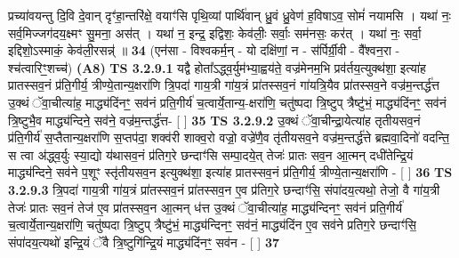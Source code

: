 \documentclass[17pt]{extarticle}
\begin{document}
                  प्रच्या॑वयन्तु दि॒वि दे॒वान् दृꣳ॑हा॒न्तरि॑क्षे॒ वयाꣳ॑सि पृथि॒व्यां पार्थि॑वान् ध्रु॒वं ध्रु॒वेण॑ ह॒विषाऽव॒ सोमं॑ नयामसि । यथा॑ नः॒ सर्व॒मिज्जग॑दय॒क्ष्मꣳ सु॒मना॒ अस॑त् । यथा॑ न॒ इन्द्र॒ इद्विशः॒ केव॑लीः॒ सर्वाः॒ सम॑नसः॒ कर॑त् । यथा॑ नः॒ सर्वा॒ इद्दिशो॒ऽस्माकं॒ केव॑ली॒रसन्न्॑ ॥ \textbf{  34} \newline
                  \newline
                      (एन॑सा - विश्वकर्म॒न् - यो दक्षि॑णां॒ न - स॑र्पिर्ग्री॒वी - वै᳚श्वन॒रा - श्च॑त्वारिꣳ॒॒शच्च॑)  \textbf{(A8)} \newline \newline
                                        \textbf{ TS 3.2.9.1} \newline
                  यद्वै होता᳚ऽद्ध्व॒र्युम॑भ्या॒ह्वय॑ते॒ वज्र॑मेनम॒भि प्रव॑र्तय॒त्युक्थ॑शा॒ इत्या॑ह प्रातस्सव॒नं प्र॑ति॒गीर्य॒ त्रीण्ये॒तान्य॒क्षरा॑णि त्रि॒पदा॑ गाय॒त्री गा॑य॒त्रं प्रा॑तस्सव॒नं गा॑यत्रि॒यैव प्रा॑तस्सव॒ने वज्र॑म॒न्तर्द्ध॑त्त उ॒क्थं ॅवा॒चीत्या॑ह॒ माद्ध्य॑दिंनꣳ॒॒ सव॑नं प्रति॒गीर्य॑ च॒त्वार्ये॒तान्य॒-क्षरा॑णि॒ चतु॑ष्पदा त्रि॒ष्टुप् त्रैष्टु॑भं॒ माद्ध्य॑दिंनꣳ॒॒ सव॑नं त्रि॒ष्टुभै॒व माद्ध्य॑न्दिने॒ सव॑ने॒ वज्र॑म॒न्तर्द्ध॑त्त-  [  ] \textbf{  35} \newline
                  \newline
                                \textbf{ TS 3.2.9.2} \newline
                  उ॒क्थं ॅवा॒चीन्द्रा॒येत्या॑ह तृतीयसव॒नं प्र॑ति॒गीर्य॑ स॒प्तैतान्य॒क्षरा॑णि स॒प्तप॑दा॒ शक्व॑री शाक्व॒रो वज्रो॒ वज्रे॑णै॒व तृ॑तीयसव॒ने वज्र॑म॒न्तर्द्ध॑त्ते ब्रह्मवा॒दिनो॑ वदन्ति॒ स त्वा अ॑द्ध्व॒र्युः स्या॒द्यो य॑थासव॒नं प्र॑तिग॒रे छन्दाꣳ॑सि सम्पा॒दये॒त् तेजः॑ प्रातः सव॒न आ॒त्मन् दधी॑तेन्द्रि॒यं माद्ध्य॑न्दिने॒ सव॑ने प॒शूꣳ स्तृ॑तीयसव॒न इत्युक्थ॑शा॒ इत्या॑ह प्रातस्सव॒नं प्र॑ति॒गीर्य॒ त्रीण्ये॒तान्य॒क्षरा॑णि - [  ] \textbf{  36} \newline
                  \newline
                                \textbf{ TS 3.2.9.3} \newline
                  त्रि॒पदा॑ गाय॒त्री गा॑य॒त्रं प्रा॑तस्सव॒नं प्रा॑तस्सव॒न ए॒व प्र॑तिग॒रे छन्दाꣳ॑सि॒ संपा॑दय॒त्यथो॒ तेजो॒ वै गा॑य॒त्री तेजः॑ प्रातः सव॒नं तेज॑ ए॒व प्रा॑तस्सव॒न आ॒त्मन् ध॑त्त उ॒क्थं ॅवा॒चीत्या॑ह॒ माद्ध्य॑न्दिनꣳ॒॒ सव॑नं प्रति॒गीर्य॑ च॒त्वार्ये॒तान्य॒क्षरा॑णि॒ चतु॑ष्पदा त्रि॒ष्टुप् त्रैष्टु॑भं॒ माद्ध्य॑न्दिनꣳ॒॒ सव॑नं॒ माद्ध्य॑दिंन ए॒व सव॑ने प्रतिग॒रे छन्दाꣳ॑सि॒ संपा॑दय॒त्यथो॑ इन्द्रि॒यं ॅवै त्रि॒ष्टुगि॑न्द्रि॒यं माद्ध्य॑दिंनꣳ॒॒ सव॑न - [  ] \textbf{  37} \newline
\end{document}

